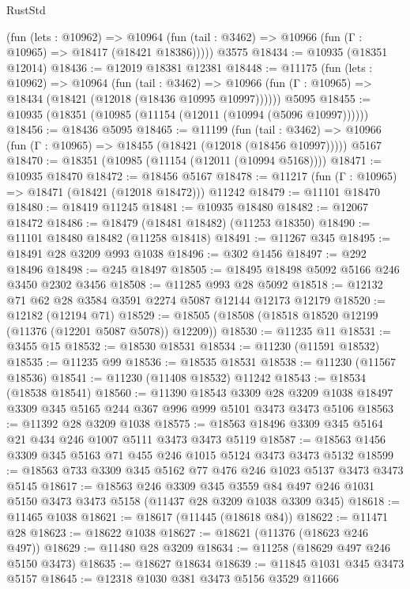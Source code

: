 \begin{lexlean}{RustStd}
\begin{coremodule}
{\begin{coremodule}
{{{{{{{{{{{{{{{{{{{{{{{{{{{{{{{{{{{{{{{{{{{{{{{{{{{{{{{{{{{{{{{{{{{{{{{{{{{{{{{{{{{{{      (fun (lets : @10962) =>
      @10964 (fun (tail : @3462) => @10966 (fun (Γ : @10965) => @18417 (@18421 @18386)))))
    @3575
@18434 := @10935 (@18351 @12014)
@18436 := @12019 @18381 @12381
@18448 := @11175
    (fun (lets : @10962) =>
    @10964
      (fun (tail : @3462) =>
      @10966 (fun (Γ : @10965) => @18434 (@18421 (@12018 (@18436 @10995 @10997))))))
    @5095
@18455 := @10935 (@18351 (@10985 (@11154 (@12011 (@10994 (@5096 @10997))))))
@18456 := @18436 @5095
@18465 := @11199
    (fun (tail : @3462) => @10966 (fun (Γ : @10965) => @18455 (@18421 (@12018 (@18456 @10997)))))
    @5167
@18470 := @18351 (@10985 (@11154 (@12011 (@10994 @5168))))
@18471 := @10935 @18470
@18472 := @18456 @5167
@18478 := @11217 (fun (Γ : @10965) => @18471 (@18421 (@12018 @18472))) @11242
@18479 := @11101 @18470
@18480 := @18419 @11245
@18481 := @10935 @18480
@18482 := @12067 @18472
@18486 := @18479 (@18481 @18482) (@11253 @18350)
@18490 := @11101 @18480 @18482 (@11258 @18418)
@18491 := @11267 @345
@18495 := @18491 @28 @3209 @993 @1038
@18496 := @302 @1456
@18497 := @292 @18496
@18498 := @245 @18497
@18505 := @18495 @18498 @5092 @5166 @246 @3450 @2302 @3456
@18508 := @11285 @993 @28 @5092
@18518 := @12132 @71 @62 @28 @3584 @3591 @2274 @5087 @12144 @12173 @12179
@18520 := @12182 (@12194 @71)
@18529 := @18505 (@18508 (@18518 @18520 @12199 (@11376 (@12201 @5087 @5078)) @12209))
@18530 := @11235 @11
@18531 := @3455 @15
@18532 := @18530 @18531
@18534 := @11230 (@11591 @18532)
@18535 := @11235 @99
@18536 := @18535 @18531
@18538 := @11230 (@11567 @18536)
@18541 := @11230 (@11408 @18532) @11242
@18543 := @18534 (@18538 @18541)
@18560 := @11390
    @18543
    @3309
    @28
    @3209
    @1038
    @18497
    @3309
    @345
    @5165
    @244
    @367
    @996
    @999
    @5101
    @3473
    @3473
    @5106
@18563 := @11392 @28 @3209 @1038
@18575 := @18563 @18496 @3309 @345 @5164 @21 @434 @246 @1007 @5111 @3473 @3473 @5119
@18587 := @18563 @1456 @3309 @345 @5163 @71 @455 @246 @1015 @5124 @3473 @3473 @5132
@18599 := @18563 @733 @3309 @345 @5162 @77 @476 @246 @1023 @5137 @3473 @3473 @5145
@18617 := @18563
    @246
    @3309
    @345
    @3559
    @84
    @497
    @246
    @1031
    @5150
    @3473
    @3473
    @5158
    (@11437 @28 @3209 @1038 @3309 @345)
@18618 := @11465 @1038
@18621 := @18617 (@11445 (@18618 @84))
@18622 := @11471 @28
@18623 := @18622 @1038
@18627 := @18621 (@11376 (@18623 @246 @497))
@18629 := @11480 @28 @3209
@18634 := @11258 (@18629 @497 @246 @5150 @3473)
@18635 := @18627 @18634
@18639 := @11845 @1031 @345 @3473 @5157
@18645 := @12318 @1030 @381 @3473 @5156 @3529 @11666
}}}}}}}}}}}}}}}}}}}}}}}}}}}}}}}}}}}}}}}}}}}}}}}}}}}}}}}}}}}}}}}}}}}}}}}}}}}}}}}}}}}}}
\end{coremodule}}
\end{coremodule}
\end{lexlean}
